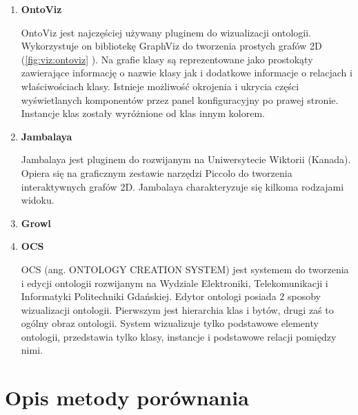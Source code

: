 \begin{enumerate}

 \item{\bf OntoViz}

  \nopagebreak 
 
 OntoViz \cite{OntoViz} jest najczęściej używany pluginem \proteges do wizualizacji ontologii. Wykorzystuje on bibliotekę GraphViz do 
tworzenia prostych grafów 2D (\figurename \space \ref{fig:viz:ontoviz} ). Na grafie klasy są reprezentowane jako prostokąty zawierające informację o
nazwie klasy jak i dodatkowe informacje o relacjach i właściwościach klasy. Istnieje możliwość okrojenia i ukrycia części wyświetlanych komponentów przez 
panel konfiguracyjny po prawej stronie. Instancje klas zostały wyróżnione od klas innym kolorem. 



 \item{\bf Jambalaya}

  \nopagebreak 
 Jambalaya \cite{Jambalaya} \cite{JambalayaProtege} jest pluginem do \proteges rozwijanym na Uniwersytecie Wiktorii (Kanada). Opiera się na graficznym zestawie
 narzędzi Piccolo do tworzenia interaktywnych grafów 2D. Jambalaya charakteryzuje się kilkoma rodzajami widoku. 

 \item{\bf Growl}

  \nopagebreak 

 \item{\bf OCS}

  \nopagebreak 

  OCS (ang. ONTOLOGY CREATION SYSTEM) jest systemem do tworzenia i edycji ontologii rozwijanym na Wydziale Elektroniki, Telekomunikacji i Informatyki Politechniki
 Gdańskiej. Edytor ontologi posiada 2 sposoby wizualizacji ontologii. Pierwszym jest hierarchia klas i bytów, drugi zaś to ogólny obraz ontologii. System wizualizuje
 tylko podstawowe elementy ontologii, przedstawia tylko klasy, instancje i podstawowe relacji pomiędzy nimi. 
 
\end{enumerate}


\section{Opis metody porównania}
